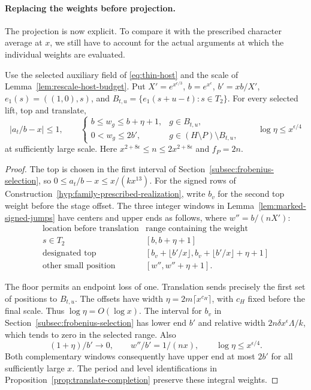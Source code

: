 \paragraph{Replacing the weights before projection.}
The projection is now explicit. To compare it with the prescribed character average at
\(x\), we still have to account for the actual arguments at which the individual
weights are evaluated.

\begin{established}\label{hyp:translate-weights}
Use the selected auxiliary field of \eqref{eq:thin-host} and the scale
of Lemma~\ref{lem:rescale-host-budget}. Put \(X'=e^{x^{\epsilon/3}}\),
\(b=e^{x^\epsilon}\), \(b'=xb/X'\), \(e_1(s)=((1,0),s)\), and
\(B_{t,u}=\{e_1(s+u-t):s\in T_2\}\). For every selected lift, top and
translate,
\[
 |a_t/b-x|\le1,\qquad
 \begin{cases} b\le w_g\le b+\eta+1,&g\in B_{t,u},\\
                0<w_g\le2b',&g\in(H\setminus P)\setminus B_{t,u},
 \end{cases}
 \qquad\log\eta\le x^{\epsilon/4}
\]
at sufficiently large scale. Here \(x^{2+8\epsilon}\le n\le2x^{2+8\epsilon}\)
and \(f_P=2n\).
\end{established}
\begin{proof}
The top is chosen in the first interval of Section~\ref{subsec:frobenius-selection},
so \(0\le a_t/b-x\le x/(kx^{13})\).
For the signed rows of Construction~\ref{hyp:family-prescribed-realization},
write \(b_v\) for the second top weight before the stage offset. The three
integer windows in Lemma~\ref{lem:marked-signed-jumps} have centers
and upper ends as follows, where \(w''=b/(nX')\):
\[
 \begin{array}{c|c}
 \text{location before translation}&\text{range containing the weight}\\ \hline
 s\in T_2 &[b,b+\eta+1]\\
 \text{designated top} &[b_v+\lfloor b'/x\rfloor,b_v+\lfloor b'/x\rfloor+\eta+1]\\
 \text{other small position} &[w'',w''+\eta+1].
 \end{array}
\]

The floor permits an endpoint loss of one. Translation sends precisely
the first set of positions to \(B_{t,u}\).
The offsets have width \(\eta=2m\lceil x^{c_H}\rceil\), with \(c_H\)
fixed before the final scale. Thus \(\log\eta=O(\log x)\).
The interval for \(b_v\) in Section~\ref{subsec:frobenius-selection}
has lower end \(b'\) and relative width \(2n\delta x^\epsilon\Lambda/k\),
which tends to zero in the selected range. Also
\[
 (1+\eta)/b'\to0,\qquad w''/b'=1/(nx),\qquad
                  \log\eta\le x^{\epsilon/4}.
\]
Both complementary windows consequently have upper end at most \(2b'\)
for all sufficiently large \(x\).
The period and level identifications in Proposition~\ref{prop:translate-completion}
preserve these integral weights.
\end{proof}

